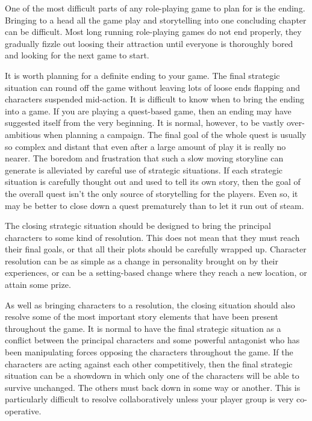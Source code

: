 \documentclass[twoside]{book}
\begin{document}
One of the most difficult parts of any role-playing game to plan for
is the ending. Bringing to a head all the game play and storytelling
into one concluding chapter can be difficult. Most long running
role-playing games do not end properly, they gradually fizzle out
loosing their attraction until everyone is thoroughly bored and
looking for the next game to start.

It is worth planning for a definite ending to your game. The final
strategic situation can round off the game without leaving lots of
loose ends flapping and characters suspended mid-action. It is
difficult to know when to bring the ending into a game. If you are
playing a quest-based game, then an ending may have suggested itself
from the very beginning. It is normal, however, to be vastly
over-ambitious when planning a campaign. The final goal of the whole
quest is usually so complex and distant that even after a large amount
of play it is really no nearer. The boredom and frustration that such
a slow moving storyline can generate is alleviated by careful use of
strategic situations. If each strategic situation is carefully thought
out and used to tell its own story, then the goal of the overall quest
isn't the only source of storytelling for the players. Even so, it may
be better to close down a quest prematurely than to let it run out of
steam.

The closing strategic situation should be designed to bring the
principal characters to some kind of resolution. This does not mean
that they must reach their final goals, or that all their plots should
be carefully wrapped up. Character resolution can be as simple as a
change in personality brought on by their experiences, or can be a
setting-based change where they reach a new location, or attain some
prize.

As well as bringing characters to a resolution, the closing situation
should also resolve some of the most important story elements that
have been present throughout the game. It is normal to have the final
strategic situation as a conflict between the principal characters and
some powerful antagonist who has been manipulating forces opposing the
characters throughout the game. If the characters are acting against
each other competitively, then the final strategic situation can be a
showdown in which only one of the characters will be able to survive
unchanged. The others must back down in some way or another. This is
particularly difficult to resolve collaboratively unless your player
group is very co-operative.
\end{document}
